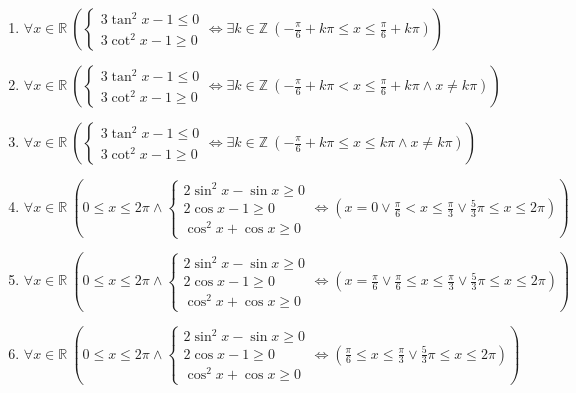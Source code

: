 \documentclass[11pt,a4paper]{article}
\begin{document}
\begin{enumerate}
\item $\displaystyle \forall x \in \mathbb{R}\ \left( \begin{cases} 3\tan^{2} x - 1 \le 0 \\ 3\cot^{2} x - 1 \ge 0 \end{cases} \iff \exists k \in \mathbb{Z}\ \left( -\frac{\pi}{6} + k\pi \le x \le \frac{\pi}{6} + k\pi \right) \right)$
\item $\displaystyle \forall x \in \mathbb{R}\ \left( \begin{cases} 3\tan^{2} x - 1 \le 0 \\ 3\cot^{2} x - 1 \ge 0 \end{cases} \iff \exists k \in \mathbb{Z}\ \left( -\frac{\pi}{6} + k\pi < x \le \frac{\pi}{6} + k\pi \land x \neq k\pi \right) \right)$
\item $\displaystyle \forall x \in \mathbb{R}\ \left( \begin{cases} 3\tan^{2} x - 1 \le 0 \\ 3\cot^{2} x - 1 \ge 0 \end{cases} \iff \exists k \in \mathbb{Z}\ \left( -\frac{\pi}{6} + k\pi \le x \le k\pi \land x \neq k\pi \right) \right)$
\item $\displaystyle \forall x \in \mathbb{R}\ \left( 0 \le x \le 2\pi \land \begin{cases} 2\sin^{2} x - \sin x \ge 0 \\ 2\cos x - 1 \ge 0 \\ \cos^{2} x + \cos x \ge 0 \end{cases} \iff \left( x = 0 \lor \frac{\pi}{6} < x \le \frac{\pi}{3} \lor \frac{5}{3}\pi \le x \le 2\pi \right) \right)$
\item $\displaystyle \forall x \in \mathbb{R}\ \left( 0 \le x \le 2\pi \land \begin{cases} 2\sin^{2} x - \sin x \ge 0 \\ 2\cos x - 1 \ge 0 \\ \cos^{2} x + \cos x \ge 0 \end{cases} \iff \left( x = \frac{\pi}{6} \lor \frac{\pi}{6} \le x \le \frac{\pi}{3} \lor \frac{5}{3}\pi \le x \le 2\pi \right) \right)$
\item $\displaystyle \forall x \in \mathbb{R}\ \left( 0 \le x \le 2\pi \land \begin{cases} 2\sin^{2} x - \sin x \ge 0 \\ 2\cos x - 1 \ge 0 \\ \cos^{2} x + \cos x \ge 0 \end{cases} \iff \left( \frac{\pi}{6} \le x \le \frac{\pi}{3} \lor \frac{5}{3}\pi \le x \le 2\pi \right) \right)$

\end{enumerate}
\end{document}
